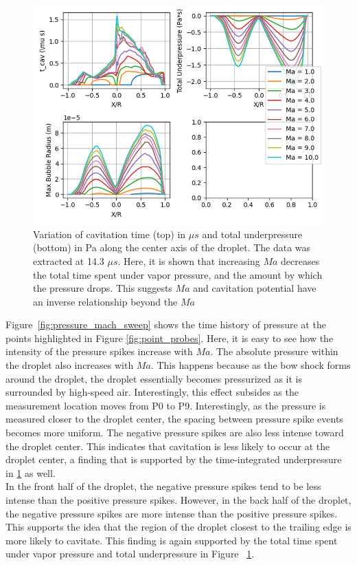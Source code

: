 \documentclass{UCF_ETD}
\begin{document}
\begin{figure}
    \centering
    \includegraphics[width=0.9\linewidth]{Figures/cavitation.png}
    \caption{Variation of cavitation time (top) in $\mu s$ and total underpressure (bottom) in Pa along the center axis of the droplet. The data was extracted at 14.3 $\mu s$. Here, it is shown that increasing $Ma$ decreases the total time spent under vapor pressure, and the amount by which the pressure drops. This suggests $Ma$ and cavitation potential have an inverse relationship beyond the $Ma$}
    \label{fig:cav_time_and_underpressure_centerline}
\end{figure}

Figure~\ref{fig:pressure_mach_sweep} shows the time history of pressure at the points highlighted in Figure \ref{fig:point_probes}.
Here, it is easy to see how the intensity of the pressure spikes increase with $Ma$.
The absolute pressure within the droplet also increases with $Ma$.
This happens because as the bow shock forms around the droplet, the droplet essentially becomes pressurized as it is surrounded by high-speed air.
Interestingly, this effect subsides as the measurement location moves from P0 to P9.
Interestingly, as the pressure is measured closer to the droplet center, the spacing between pressure spike events becomes more uniform.
The negative pressure spikes are also less intense toward the droplet center.
This indicates that cavitation is less likely to occur at the droplet center, a finding that is supported by the time-integrated underpressure in \ref{fig:cav_time_and_underpressure_centerline} as well.\\

In the front half of the droplet, the negative pressure spikes tend to be less intense than the positive pressure spikes.
However, in the back half of the droplet, the negative pressure spikes are more intense than the positive pressure spikes.
This supports the idea that the region of the droplet closest to the trailing edge is more likely to cavitate. This finding is again supported by the total time spent under vapor pressure and total underpressure in Figure ~\ref{fig:cav_time_and_underpressure_centerline}.
\end{document}
